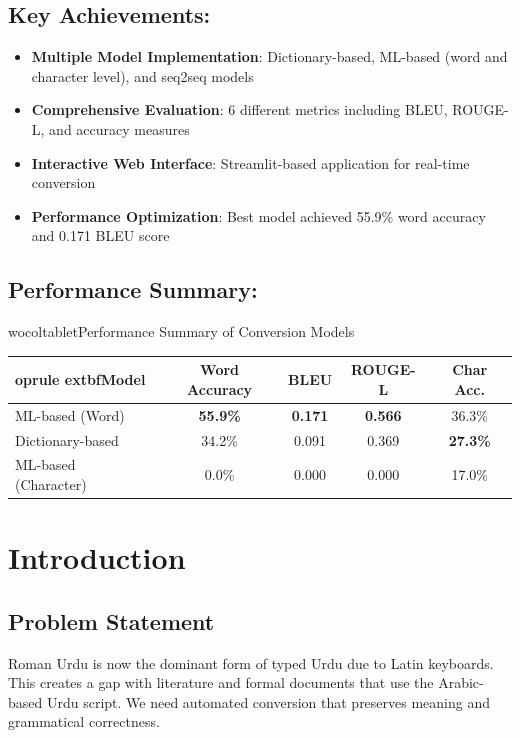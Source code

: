 \documentclass[10pt,twocolumn]{article}
\newenvironment{keyachievements}{%
  \begin{itemize}[leftmargin=12pt,itemsep=1pt,topsep=2pt,parsep=0pt,partopsep=0pt]
}{%
  \end{itemize}
}
\begin{document}
\subsection*{Key Achievements:}
\begin{keyachievements}
\item \textbf{Multiple Model Implementation}: Dictionary-based, ML-based (word and character level), and seq2seq models
\item \textbf{Comprehensive Evaluation}: 6 different metrics including BLEU, ROUGE-L, and accuracy measures
\item \textbf{Interactive Web Interface}: Streamlit-based application for real-time conversion
\item \textbf{Performance Optimization}: Best model achieved 55.9\% word accuracy and 0.171 BLEU score
\end{keyachievements}

\subsection*{Performance Summary:}
	wocoltable{t}{Performance Summary of Conversion Models}{%
\label{tab:performance_summary}
\begin{tabular}{lcccc}
	oprule
	extbf{Model} & \textbf{Word Accuracy} & \textbf{BLEU} & \textbf{ROUGE-L} & \textbf{Char Acc.} \\
\midrule
ML-based (Word) & \textbf{55.9\%} & \textbf{0.171} & \textbf{0.566} & 36.3\% \\
Dictionary-based & 34.2\% & 0.091 & 0.369 & \textbf{27.3\%} \\
ML-based (Character) & 0.0\% & 0.000 & 0.000 & 17.0\% \\
\bottomrule
\end{tabular}%
}

\section{Introduction}

\subsection{Problem Statement}
Roman Urdu is now the dominant form of typed Urdu due to Latin keyboards. This creates a gap with literature and formal documents that use the Arabic-based Urdu script. We need automated conversion that preserves meaning and grammatical correctness.
\end{document}
